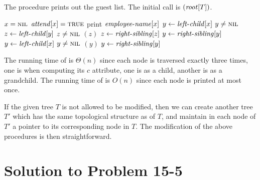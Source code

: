 \documentclass[a4paper, fleqn]{article}
\begin{document}
The procedure  prints out the guest list. The
initial call is $(\id{root}[T])$.

\begin{codebox}
\li \If $x = \textnormal{\scshape nil}$
\li   \Then
        \Return
      \End
\li \If $\id{attend}[x] = \const{true}$
\li   \Then
        print $\id{employee-name}[x]$
\li     $y \gets \id{left-child}[x]$
\li     \While $y \neq \textnormal{\scshape nil}$
\li       \Do
            $z \gets \id{left-child}[y]$
\li         \While $z \neq \textnormal{\scshape nil}$
\li           \Do
                $(z)$
\li             $z \gets \id{right-sibling}[z]$
              \End
\li         $y \gets \id{right-sibling}[y]$
          \End 
\li   \Else
        $y \gets \id{left-child}[x]$
\li     \While $y \neq \textnormal{\scshape nil}$
\li       \Do
            $(y)$
\li         $y \gets \id{right-sibling}[y]$
          \End
      \End
\end{codebox}

The running time of  is $\Theta(n)$ since each node
is traversed exactly three times, one is when computing its $c$
attribute, one is as a child, another is as a grandchild. The running
time of  is $O(n)$ since each node is printed
at most once.

If the given tree $T$ is not allowed to be modified, then we can
create another tree $T'$ which has the same topological structure as
of $T$, and maintain in each node of $T'$ a pointer to its
corresponding node in $T$. The modification of the above procedures is
then straightforward.






\section*{Solution to Problem 15-5}
\end{document}
